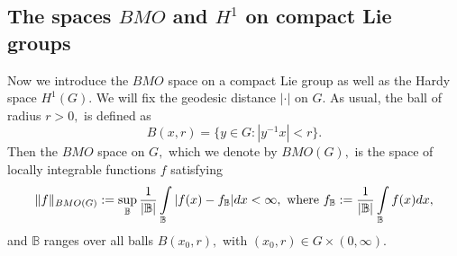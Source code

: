 \documentclass[12pt, reqno]{amsart}
\theoremstyle{definition}
\theoremstyle{remark}
\numberwithin{equation}{section}
\begin{document}
\subsection{The spaces $BMO$ and $H^1$  on compact Lie groups}
Now we introduce the $BMO$ space on a compact Lie group as well as the Hardy space $H^1(G).$  We will fix the geodesic distance $|\cdot|$ on $G.$  As usual, the ball of radius $r>0,$ is defined as 
\[ 
    B(x,r)=\{y\in G:|y^{-1}x|<r\}.
\]Then the $BMO$ space on $G,$ which we denote by ${BMO}(G),$ is the space of locally integrable functions $f$ satisfying
\[ 
    \Vert f\Vert_{{BMO}(G)}:=\sup_{\mathbb{B}}\frac{1}{|\mathbb{B}|}\int\limits_{\mathbb{B}}|f(x)-f_{\mathbb{B}}|dx<\infty,\textnormal{ where  } f_{\mathbb{B}}:=\frac{1}{|\mathbb{B}|}\int\limits_{\mathbb{B}}f(x)dx,
\]
and $\mathbb{B}$ ranges over all balls $B(x_{0},r),$ with $(x_0,r)\in G\times (0,\infty).$ 
\end{document}
